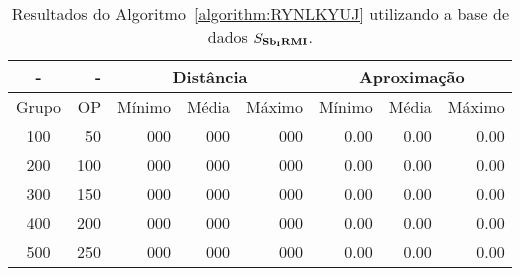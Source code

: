 \begin{table}[!htb]
  \caption{Resultados do Algoritmo~\ref{algorithm:RYNLKYUJ} utilizando a base de dados $S_{\textbf{Sb\textsubscript{I}RMI}}{}$.}
  \label{table:CIYAALPZ}
  \centering
  \begin{tabular}{|c|r|r|r|r|r|r|r|}
    \hline
      -      &  -   & \multicolumn{3}{c|}{Distância}             & \multicolumn{3}{c|}{Aproximação}           \\ \hline
    Grupo    & OP   & Mínimo       & Média        & Máximo       & Mínimo       & Média        & Máximo       \\ \hline  
    100      & 50   & 000          & 000          & 000          & 0.00         & 0.00         & 0.00         \\ \hline
    200      & 100  & 000          & 000          & 000          & 0.00         & 0.00         & 0.00         \\ \hline
    300      & 150  & 000          & 000          & 000          & 0.00         & 0.00         & 0.00         \\ \hline
    400      & 200  & 000          & 000          & 000          & 0.00         & 0.00         & 0.00         \\ \hline
    500      & 250  & 000          & 000          & 000          & 0.00         & 0.00         & 0.00         \\ \hline    
  \end{tabular}
\end{table}